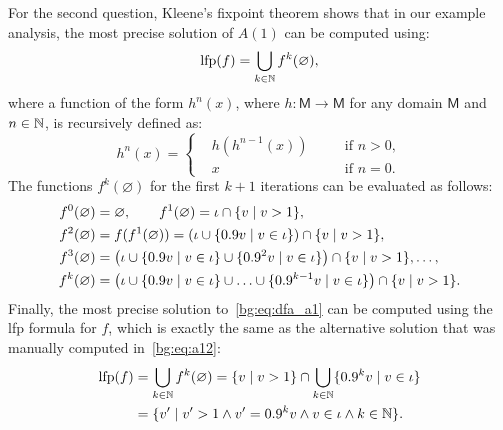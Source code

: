 For the second question, Kleene's fixpoint theorem shows that in our example
analysis, the most precise solution of $A(1)$ can be computed using:
\begin{equation}
    \operatorname{\mathrm{lfp}} (f) = \bigcup_{k \in \mathbb{N}} f^k (\varnothing),
\end{equation}
where a function of the form $h^n(x)$, where $h: \mathsf{M} \to \mathsf{M}$ for
any domain $\mathsf{M}$ and $n \in \mathbb{N}$, is recursively defined as:
\begin{equation}
    h^n(x) = \left\{
        \begin{aligned}
            & h(h^{n-1}(x)) \quad && \text{if~} n > 0, \\
            & x && \text{if~} n = 0.
        \end{aligned}
    \right.
\end{equation}
The functions $f^k(\varnothing)$ for the first $k+1$ iterations can be
evaluated as follows:
\begin{equation}
    \begin{aligned}
        f^0(\varnothing) &= \varnothing, \quad\quad
        f^1(\varnothing) = \iota \cap \{ v \mid v > 1 \}, \\
        f^2(\varnothing) &= f(f^1(\varnothing))
               = \left(
                     \iota \cup
                     \{ 0.9v \mid v \in \iota \}
                 \right) \cap \{ v \mid v > 1 \}, \\
        f^3(\varnothing) &= \left(
                     \iota \cup
                     \{ 0.9v \mid v \in \iota \} \cup
                     \{ 0.9^2 v \mid v \in \iota \}
                 \right) \cap \{ v \mid v > 1 \}, \mathellipsis, \\
        f^k(\varnothing) &= \left(
                     \iota \cup
                     \{ 0.9v \mid v \in \iota \} \cup
                     \mathellipsis \cup
                     \{ 0.9^{k-1} v \mid v \in \iota \}
                 \right) \cap \{ v \mid v > 1 \}.
    \end{aligned}
\end{equation}
Finally, the most precise solution to~\eqref{bg:eq:dfa_a1} can be computed
using the \gls{lfp} formula for $f$, which is exactly the same as the
alternative solution that was manually computed in~\eqref{bg:eq:a12}:
\begin{equation}
    \begin{aligned}
        \operatorname{\mathrm{lfp}} (f)
            &= \bigcup_{k \in \mathbb{N}} f^k (\varnothing)
             = \{ v \mid v > 1 \} \cap
               \bigcup_{k \in \mathbb{N}} \{ 0.9^k v \mid v \in \iota \} \\
            &= \{
               v^\prime \mid
               v^\prime > 1 \wedge v^\prime = 0.9^k v \wedge
               v \in \iota \wedge k \in \mathbb{N}
            \}.
    \end{aligned}
\end{equation}

